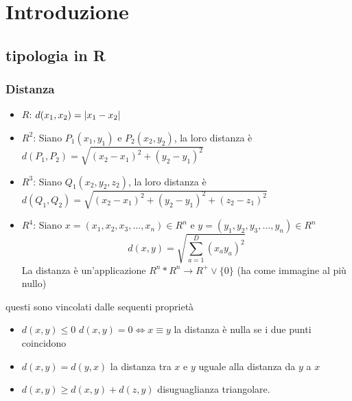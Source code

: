 \chapter{Introduzione}
\section{tipologia in R}
\subsection{Distanza}
\begin{itemize}
\item {\color{red} $R$}: $d(x_1,x_2)=\lvert x_1-x_2\rvert$
\item {\color{red} $R^2$}: Siano $P_1(x_1,y_1)$ e $P_2(x_2,y_2)$, la loro distanza è $d(P_1,P_2)=\sqrt{(x_2-x_1)^2+(y_2-y_1)^2}$
\item {\color{red} $R^3$}: Siano $Q_1(x_2,y_2,z_2)$, la loro distanza è $d(Q_1,Q_2)=\sqrt{(x_2-x_1)^2+(y_2-y_1)^2+(z_2-z_1)^2}$
\item {\color{red} $R^4$}: Siano $x=(x_1,x_2,x_3,\dots,x_n)\in R^n$ e $y=(y_1,y_2,y_3,\dots,y_n)\in R^n$
  \begin{equation*}
    d(x,y)=\sqrt{\sum^D_{a=1}(x_ay_a)^2}
  \end{equation*}
  La distanza è un'applicazione $R^n*R^n\to R^+\vee \{0\}$ (ha come immagine al più nullo)
\end{itemize}
\begin{pro}
  questi sono vincolati dalle sequenti proprietà
  \begin{itemize}
  \item $d(x,y)\leq 0$ $d(x,y)=0 \Leftrightarrow x\equiv y$ la distanza è nulla se i due punti coincidono
  \item $d(x,y) = d(y,x)$ la distanza tra $x$ e $y$ uguale alla distanza da $y$ a $x$
  \item $d(x,y)\geq d(x,y)+d(z,y)$ disuguaglianza triangolare.
  \end{itemize}
\end{pro}
